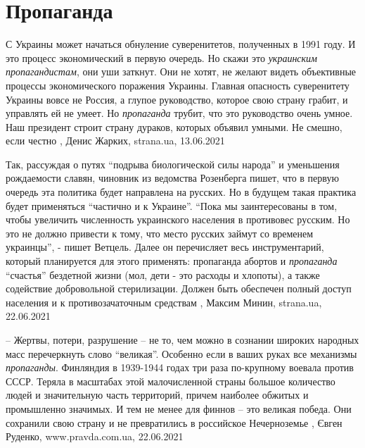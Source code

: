 
 
 
 
 
\chapter{Пропаганда}
\label{sec:slova.propaganda}

С Украины может начаться обнуление суверенитетов, полученных в 1991 году. И это
процесс экономический в первую очередь. Но скажи это \emph{украинским пропагандистам},
они уши заткнут. Они не хотят, не желают видеть объективные процессы
экономического поражения Украины. Главная опасность суверенитету Украины вовсе
не Россия, а глупое руководство, которое свою страну грабит, и управлять ей не
умеет. Но \emph{пропаганда} трубит, что это руководство очень умное. Наш президент
строит страну дураков, которых объявил умными. Не смешно, если честно
, 
Денис Жарких, strana.ua, 13.06.2021

Так, рассуждая о путях \enquote{подрыва биологической силы народа} и уменьшения
рождаемости славян, чиновник из ведомства Розенберга пишет, что в первую
очередь эта политика будет направлена на русских. Но в будущем такая практика
будет применяться \enquote{частично и к Украине}.  \enquote{Пока мы заинтересованы в том, чтобы
увеличить численность украинского населения в противовес русским. Но это не
должно привести к тому, что место русских займут со временем украинцы}, - пишет
Ветцель.  Далее он перечисляет весь инструментарий, который планируется для
этого применять: пропаганда абортов и \emph{пропаганда} \enquote{счастья} бездетной жизни
(мол, дети - это расходы и хлопоты), а также содействие добровольной
стерилизации. Должен быть обеспечен полный доступ населения и к
противозачаточным средствам
  , Максим Минин, strana.ua, 22.06.2021

– Жертвы, потери, разрушение – не то, чем можно в сознании широких народных
масс перечеркнуть слово \enquote{великая}. Особенно если в ваших руках все механизмы
\emph{пропаганды}.  Финляндия в 1939-1944 годах три раза по-крупному воевала против
СССР. Теряла в масштабах этой малочисленной страны большое количество людей и
значительную часть территорий, причем наиболее обжитых и промышленно значимых.
И тем не менее для финнов – это великая победа. Они сохранили свою страну и не
превратились в российское Нечерноземье
  , 
	Євген Руденко, www.pravda.com.ua, 22.06.2021

